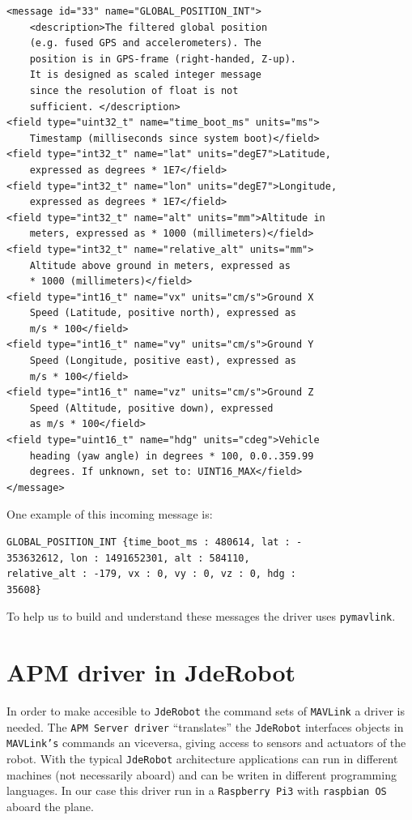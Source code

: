 \documentclass{llncs}
\begin{document}
\begin{verbatim}
<message id="33" name="GLOBAL_POSITION_INT">
	<description>The filtered global position 
	(e.g. fused GPS and accelerometers). The 
	position is in GPS-frame (right-handed, Z-up).
	It is designed as scaled integer message 
	since the resolution of float is not 
	sufficient.	</description>
<field type="uint32_t" name="time_boot_ms" units="ms">
	Timestamp (milliseconds since system boot)</field>
<field type="int32_t" name="lat" units="degE7">Latitude, 
	expressed as degrees * 1E7</field>
<field type="int32_t" name="lon" units="degE7">Longitude, 
	expressed as degrees * 1E7</field>
<field type="int32_t" name="alt" units="mm">Altitude in 
	meters, expressed as * 1000 (millimeters)</field>
<field type="int32_t" name="relative_alt" units="mm">
	Altitude above ground in meters, expressed as 
	* 1000 (millimeters)</field>
<field type="int16_t" name="vx" units="cm/s">Ground X 
	Speed (Latitude, positive north), expressed as 
	m/s * 100</field>
<field type="int16_t" name="vy" units="cm/s">Ground Y 
	Speed (Longitude, positive east), expressed as 
	m/s * 100</field>
<field type="int16_t" name="vz" units="cm/s">Ground Z 
	Speed (Altitude, positive down), expressed 
	as m/s * 100</field>
<field type="uint16_t" name="hdg" units="cdeg">Vehicle 
	heading (yaw angle) in degrees * 100, 0.0..359.99 
	degrees. If unknown, set to: UINT16_MAX</field>
</message>
\end{verbatim}

One example of this incoming message is:
\begin{verbatim}
GLOBAL_POSITION_INT {time_boot_ms : 480614, lat : -
353632612, lon : 1491652301, alt : 584110, 
relative_alt : -179, vx : 0, vy : 0, vz : 0, hdg : 
35608}
\end{verbatim}

To help us to build and understand these messages the driver uses \texttt{pymavlink}.


\section{APM driver in JdeRobot}

In order to make accesible to \texttt{JdeRobot} the command sets of \texttt{MAVLink} a driver is needed. The \texttt{APM Server driver} ``translates'' the \texttt{JdeRobot} interfaces objects in \texttt{MAVLink's} commands an viceversa, giving access to sensors and actuators of the robot. With the typical \texttt{JdeRobot} architecture applications can run in different machines (not necessarily aboard) and can be writen in different programming languages. 
In our case this driver run in a \texttt{Raspberry Pi3} with \texttt{raspbian OS} aboard the plane.
\end{document}
